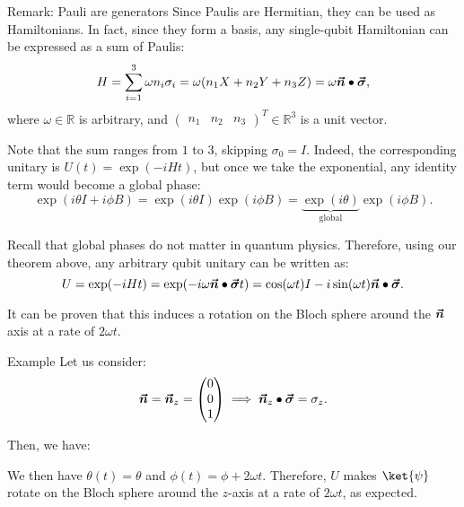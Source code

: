 \documentclass[a4paper]{article}
\begin{document}
\begin{parag}{Remark: Pauli are generators}
    Since Paulis are Hermitian, they can be used as Hamiltonians. In fact, since they form a basis, any single-qubit Hamiltonian can be expressed as a sum of Paulis: 
    \[H = \sum_{i=1}^{3} \omega n_i \sigma_i = \omega\left(n_1 X + n_2 Y + n_3 Z\right) = \omega \bvec{n} \dotprod \bvec{\sigma},\]
    where $\omega \in \mathbb{R}$ is arbitrary, and $\begin{pmatrix} n_1 & n_2 & n_3 \end{pmatrix}^T \in \mathbb{R}^3$ is a unit vector.
    
    Note that the sum ranges from $1$ to $3$, skipping $\sigma_0 = I$. Indeed, the corresponding unitary is $U\left(t\right) = \exp\left(-i H t\right)$, but once we take the exponential, any identity term would become a global phase: 
    \[\exp\left(i \theta I + i\phi B\right) = \exp\left(i \theta I\right) \exp\left(i \phi B\right) = \underbrace{\exp\left(i \theta\right)}_{\text{global}} \exp\left(i \phi B\right).\]

    Recall that global phases do not matter in quantum physics. Therefore, using our theorem above, any arbitrary qubit unitary can be written as: 
    \[U = \exp\left(-i H t\right) = \exp\left(-i \omega \bvec{n} \dotprod \bvec{\sigma} t\right) = \cos\left(\omega t\right) I - i \sin\left(\omega t\right) \bvec{n} \dotprod \bvec{\sigma}.\]

    It can be proven that this induces a rotation on the Bloch sphere around the $\bm{\protect\vec{n}}$ axis at a rate of $2 \omega t$.

    \begin{subparag}{Example}
        Let us consider: 
        \[\bm{\protect\vec{n}} = \bm{\protect\vec{n}}_z = \begin{pmatrix} 0 \\ 0 \\ 1 \end{pmatrix} \implies \bm{\protect\vec{n}}_z \bullet \bm{\protect\vec{\sigma}} = \sigma_z.\]

        Then, we have: 

        We then have $\theta\left(t\right) = \theta$ and $\phi\left(t\right) = \phi + 2 \omega t$. Therefore, $U$ makes $\ket{\psi}$ rotate on the Bloch sphere around the $z$-axis at a rate of $2 \omega t$, as expected.
    \end{subparag}
\end{parag}
\end{document}
